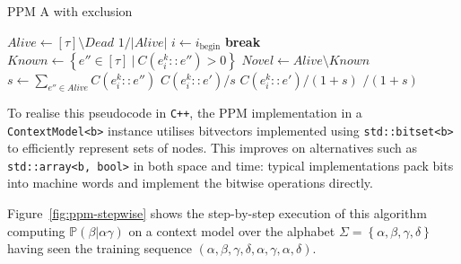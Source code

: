 \documentclass[12pt,a4paper,twoside,openright]{report}
\newcommand{\set}[1]{ \left\{ #1 \right\} }
\begin{document}
\begin{algorithm}[H]
  \caption{PPM A with exclusion}
  \label{alg:ppm-a}
  \begin{algorithmic}[1]
      \State $\textit{Alive} \gets [\tau] \setminus \textit{Dead}$
      \State \Return $1 / |\textit{Alive}|$ 
      \EndIf
      \State $i \gets i_{\mathrm{begin}}$
       \textbf{break}
        \EndIf       
      \EndFor 
      \State $\textit{Known} \gets \set{ e'' \in [\tau]\ |\ C(e_i^k :: e'') > 0 }$
      \State $\textit{Novel} \gets Alive \setminus Known$ 
      \State $s \gets \sum_{e'' \in \textit{Alive}} C(e_i^k :: e'')$ 
        \State \Return $C(e_i^k :: e') / s$ 
      \EndIf
      \State \Return $C(e_i^k::e') / (1 + s)$ 
      \EndIf
      \State \Return {}$ / (1
      + s)$ 
    \EndFunction
  \end{algorithmic}
\end{algorithm}

To realise this pseudocode in \texttt{C++}, the PPM implementation in a
\texttt{ContextModel<b>} instance utilises bitvectors implemented using
\texttt{std::bitset<b>} to efficiently represent sets of nodes. This improves on
alternatives such as \texttt{std::array<b, bool>} in both space and time:
typical implementations pack bits into machine words and implement the bitwise
operations directly.

Figure~\ref{fig:ppm-stepwise} shows the step-by-step execution of this algorithm
computing $\mathbb{P}(\beta|\alpha\gamma)$ on a context model over the alphabet
$\Sigma = \set{\alpha,\beta,\gamma,\delta}$ having seen the training sequence
$(\alpha,\beta,\gamma,\delta,\alpha,\gamma,\alpha,\delta)$.
\end{document}
